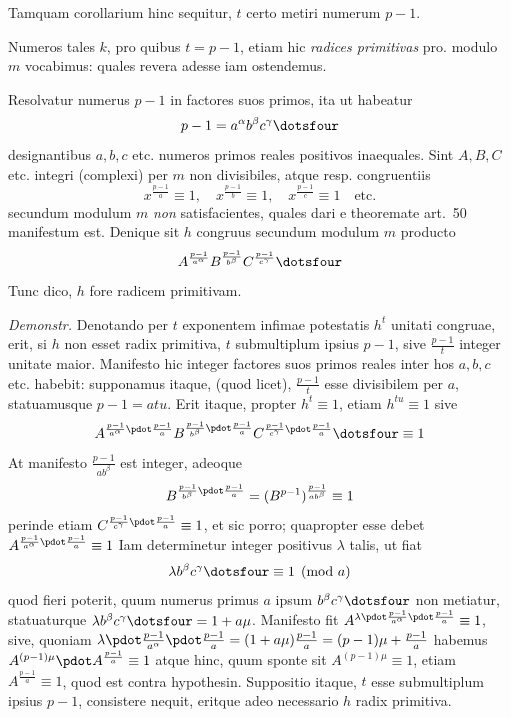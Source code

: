 Tamquam corollarium hinc sequitur, $t$ certo metiri numerum $p-1$.

Numeros tales $k$, pro quibus $t=p-1$, etiam hic \emph{radices primitivas} pro. modulo $m$ vocabimus: quales revera adesse iam ostendemus.

Resolvatur numerus $p-1$ in factores suos primos, ita ut habeatur
\[
p-1=a^\alpha b^\beta c^\gamma\dotsfour
\]
designantibus $a,b,c$ etc. numeros primos reales positivos inaequales. Sint $A,B,C$ etc. integri (complexi) per $m$ non divisibiles, atque resp. congruentiis
\[
x^{\frac{p-1}a}\equiv1,\quad x^{\frac{p-1}b}\equiv1,\quad x^{\frac{p-1}c}\equiv1\quad\text{etc.}
\]
secundum modulum $m$ \emph{non} satisfacientes, quales dari e theoremate art.~50 manifestum est. Denique sit $h$ congruus secundum modulum $m$ producto
\[
A^{\frac{p-1}{a^\alpha}}B^{\frac{p-1}{b^\beta}}C^{\frac{p-1}{c^\gamma}}\dotsfour
\]
Tunc dico, $h$ fore radicem primitivam.

\emph{Demonstr.} Denotando per $t$ exponentem infimae potestatis $h^t$ unitati congruae, erit, si $h$ non esset radix primitiva, $t$ submultiplum ipsius $p-1$, sive $\frac{p-1}t$ integer unitate maior. Manifesto hic integer factores suos primos reales inter hos $a,b,c$ etc. habebit: supponamus itaque, (quod licet), $\frac{p-1}t$ esse divisibilem per $a$, statuamusque $p-1=atu$. Erit itaque, propter $h^t\equiv1$, etiam $h^{tu}\equiv1$ sive
\[
A^{\frac{p-1}{a^\alpha}\pdot\frac{p-1}a}B^{\frac{p-1}{b^\beta}\pdot\frac{p-1}a}C^{\frac{p-1}{c^\gamma}\pdot\frac{p-1}a}\dotsfour\equiv1
\]
At manifesto $\frac{p-1}{ab^\beta}$ est integer, adeoque
\[
B^{\frac{p-1}{b^\beta}\pdot\frac{p-1}a}=(B^{p-1})^{\frac{p-1}{ab^\beta}}\equiv1
\]
perinde etiam
%
$C^{\frac{p-1}{c^\gamma}\pdot\frac{p-1}a}\equiv1$, et sic porro; quapropter esse debet $A^{\frac{p-1}{a^\alpha}\pdot\frac{p-1}a}\equiv1$
Iam determinetur integer positivus $\lambda$ talis, ut fiat
\[
\lambda b^\beta c^\gamma\dotsfour\equiv1\pmod a
\]
quod fieri poterit, quum numerus primus $a$ ipsum $b^\beta c^\gamma\dotsfour$ non metiatur, statuaturque $\lambda b^\beta c^\gamma\dotsfour=1+a\mu$. Manifesto fit $A^{\lambda\pdot\frac{p-1}{a^\alpha}\pdot\frac{p-1}a}\equiv1$, sive, quoniam $\lambda\pdot\frac{p-1}{a^\alpha}\pdot\frac{p-1}a=(1+a\mu)\frac{p-1}a=(p-1)\mu+\frac{p-1}a$ habemus $A^{(p-1)\mu}\pdot A^{\frac{p-1}a}\equiv1$ atque hinc, quum sponte sit $A^{(p-1)\mu}\equiv1$, etiam $A^{\frac{p-1}a}\equiv1$, quod est contra hypothesin. Suppositio itaque, $t$ esse submultiplum ipsius $p-1$, consistere nequit, eritque adeo necessario $h$ radix primitiva.

